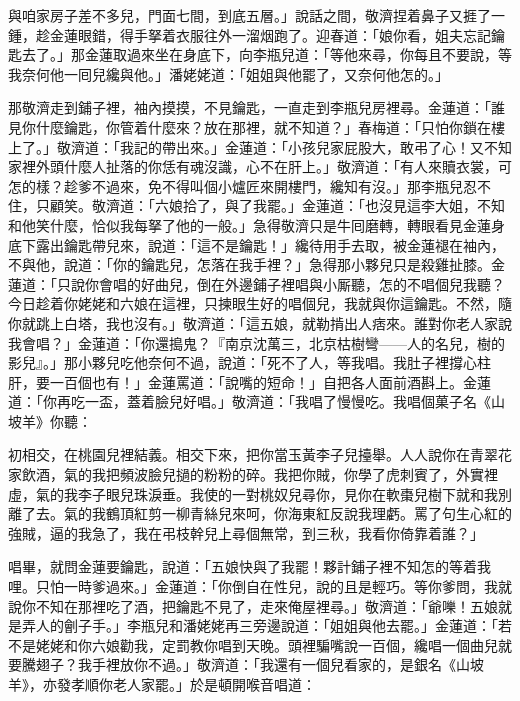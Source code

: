與咱家房子差不多兒，門面七間，到底五層。」說話之間，敬濟捏着鼻子又捱了一鍾，趁金蓮眼錯，得手拏着衣服往外一溜烟跑了。迎春道：「娘你看，姐夫忘記鑰匙去了。」那金蓮取過來坐在身底下，向李瓶兒道：「等他來尋，你每且不要說，等我奈何他一囘兒纔與他。」潘姥姥道：「姐姐與他罷了，又奈何他怎的。」

那敬濟走到鋪子裡，袖內摸摸，不見鑰匙，一直走到李瓶兒房裡尋。金蓮道：「誰見你什麼鑰匙，你管着什麼來？放在那裡，就不知道？」春梅道：「只怕你鎖在樓上了。」敬濟道：「我記的帶出來。」金蓮道：「小孩兒家屁股大，敢弔了心！又不知家裡外頭什麼人扯落的你恁有魂沒識，心不在肝上。」{}敬濟道：「有人來贖衣裳，可怎的樣？趁爹不過來，免不得叫個小爐匠來開樓門，纔知有沒。」那李瓶兒忍不住，只顧笑。敬濟道：「六娘拾了，與了我罷。」金蓮道：「也沒見這李大姐，不知和他笑什麼，恰似我每拏了他的一般。」急得敬濟只是牛囘磨轉，轉眼看見金蓮身底下露出鑰匙帶兒來，說道：「這不是鑰匙！」纔待用手去取，被金蓮褪在袖內，不與他，說道：「你的鑰匙兒，怎落在我手裡？」急得那小夥兒只是殺雞扯膝。金蓮道：「只說你會唱的好曲兒，倒在外邊鋪子裡唱與小厮聽，怎的不唱個兒我聽？今日趁着你姥姥和六娘在這裡，只揀眼生好的唱個兒，我就與你這鑰匙。不然，隨你就跳上白塔，我也沒有。」敬濟道：「這五娘，就勒掯出人痞來。誰對你老人家說我會唱？」金蓮道：「你還搗鬼？『南京沈萬三，北京枯樹彎——人的名兒，樹的影兒』。」那小夥兒吃他奈何不過，說道：「死不了人，等我唱。我肚子裡撐心柱肝，要一百個也有！」金蓮罵道：「說嘴的短命！」自把各人面前酒斟上。金蓮道：「你再吃一盃，蓋着臉兒好唱。」敬濟道：「我唱了慢慢吃。我唱個菓子名《山坡羊》你聽：

\begin{myquote} 
初相交，在桃園兒裡結義。相交下來，把你當玉黃李子兒擡舉。人人說你在青翠花家飲酒，氣的我把頻波臉兒撾的粉粉的碎。我把你賊，你學了虎刺賓了，外實裡虛，氣的我李子眼兒珠淚垂。我使的一對桃奴兒尋你，見你在軟棗兒樹下就和我別離了去。氣的我鶴頂紅剪一柳青絲兒來呵，你海東紅反說我理虧。罵了句生心紅的強賊，逼的我急了，我在弔枝幹兒上尋個無常，到三秋，我看你倚靠着誰？」
\end{myquote} 

唱畢，就問金蓮要鑰匙，說道：「五娘快與了我罷！夥計鋪子裡不知怎的等着我哩。只怕一時爹過來。」金蓮道：「你倒自在性兒，說的且是輕巧。等你爹問，我就說你不知在那裡吃了酒，把鑰匙不見了，走來俺屋裡尋。」敬濟道：「爺嚛！五娘就是弄人的劊子手。」{}李瓶兒和潘姥姥再三旁邊說道：「姐姐與他去罷。」金蓮道：「若不是姥姥和你六娘勸我，定罰教你唱到天晚。頭裡騙嘴說一百個，纔唱一個曲兒就要騰翅子？我手裡放你不過。」敬濟道：「我還有一個兒看家的，是銀名《山坡羊》，亦發孝順你老人家罷。」於是頓開喉音唱道：

